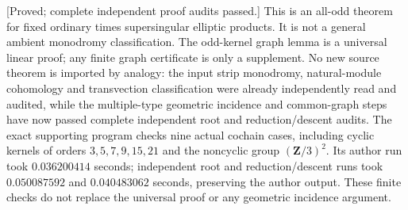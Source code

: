 \begin{remark}
\label{rem:mixed-all-odd-norm-scope-candidate}
\textup{[Proved; complete independent proof audits passed.]}
This is an all-odd theorem for fixed ordinary times
supersingular elliptic products. It is not a general ambient
monodromy classification. The odd-kernel graph lemma is a
universal linear proof; any finite graph certificate is only
a supplement. No new source theorem is imported by analogy:
the input strip monodromy, natural-module cohomology and
transvection classification were already independently read
and audited, while the multiple-type geometric incidence and
common-graph steps have now passed complete independent root and
reduction/descent audits. The exact supporting program
checks nine actual cochain cases, including cyclic kernels of orders
$3,5,7,9,15,21$ and the noncyclic group $(\mathbf Z/3)^2$.
Its author run took $0.036200414$ seconds; independent root and
reduction/descent runs took $0.050087592$ and $0.040483062$
seconds, preserving the author output. These finite checks do not
replace the universal proof or any geometric incidence argument.
\end{remark}

